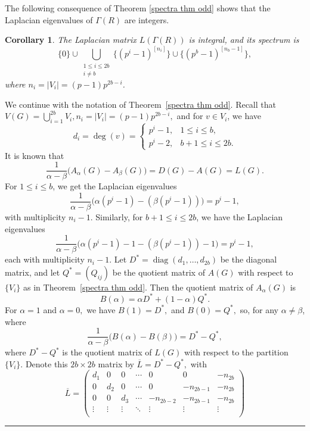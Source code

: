 \documentclass[12pt,twoside]{article}
\renewenvironment{proof}{{\noindent\bfseries Proof.}}{\qed}
\newtheorem{corollary}[theorem]{Corollary}
\def\qed{\nolinebreak\hfill\rule{.2cm}{.2cm}\par\addvspace{.5cm}}
\begin{document}
	The following consequence of Theorem \ref{spectra thm odd} shows that the Laplacian eigenvalues of $ \varGamma(R)$ are integers.
	\begin{corollary}\label{L integral odd}
		The Laplacian matrix $L( \varGamma(R))$ is integral, and its spectrum is
		\[
		\{0\}\cup\bigcup_{\substack{1\le i\le 2b\\ i\neq b}}\{(p^{ i}-1)^{[n_i]}\}\cup\{(p^{ b}-1)^{[n_b-1]}\},
		\]
		where $n_i = |V_i| = (p-1)p^{2b-i}$.
	\end{corollary}
	\begin{proof}
		We continue with the notation of Theorem~\ref{spectra thm odd}. Recall that $V(G)=\bigcup_{i=1}^{2b}V_i, n_i=|V_i|=(p-1)p^{2b-i},$ and for $v\in V_i$, we have
		\[
		d_i=\deg(v) =
		\begin{cases}
			p^{ i}-1, & 1\le i\le b,\\
			p^{ i}-2, & b+1\le i\le 2b.
		\end{cases}
		\]
		It is known that
		\[
		\frac{1}{\alpha-\beta}\bigl(A_\alpha(G)-A_\beta(G)\bigr)
		= D(G) - A(G) = L(G).
		\]
		For $1\leq i\leq b$, we get the Laplacian eigenvalues 
		$$\frac{1}{\alpha-\beta}\Big( \alpha(p^{ i}-1)-( \beta(p^{ i}-1))\Big)=p^{i}-1,$$
		 with multiplicity $n_{i}-1.$ Similarly, for $b+1\leq i\leq 2b$, we have the Laplacian eigenvalues
		 $$\frac{1}{\alpha-\beta}\Big( \alpha(p^{ i}-1)-1-( \beta(p^{ i}-1))-1\Big)=p^{i}-1,$$ each with multiplicity $n_{i}-1.$ Let $D^\ast=\operatorname{diag}(d_1,\dots,d_{2b})$ be the diagonal matrix, and let $Q^\ast=(Q_{ij})$ be the quotient matrix of $A(G)$ with respect to $\{V_i\}$ as in Theorem~\ref{spectra thm odd}. Then the quotient matrix of $A_\alpha(G)$ is
		\[
		B(\alpha) = \alpha D^\ast + (1-\alpha)Q^\ast.
		\]
		For $\alpha=1$ and $\alpha=0,$ we have $B(1)=D^\ast, $ and $ B(0)=Q^\ast,$ so, for any $\alpha\neq\beta$, where
		\[
		\frac{1}{\alpha-\beta}\bigl(B(\alpha)-B(\beta)\bigr)
		= D^\ast - Q^\ast,
		\]
		where  $D^\ast-Q^\ast$ is the quotient matrix of $L(G)$ with respect to the partition $\{V_i\}$. Denote this $2b\times 2b$ matrix by $	\overline{L}= D^\ast - Q^\ast,$ with
		\[
		\overline{L}=
		\begin{pmatrix}
			d_1 & 0   & 0   & \cdots & 0         & 0         & -n_{2b} \\[3pt]
			0   & d_2 & 0   & \cdots & 0         & -n_{2b-1} & -n_{2b} \\[3pt]
			0   & 0   & d_3 & \cdots & -n_{2b-2} & -n_{2b-1} & -n_{2b} \\[3pt]
			\vdots & \vdots & \vdots & \ddots & \vdots    & \vdots    & \vdots \\[3pt]

\end{pmatrix}\]
\end{proof}
\end{document}
